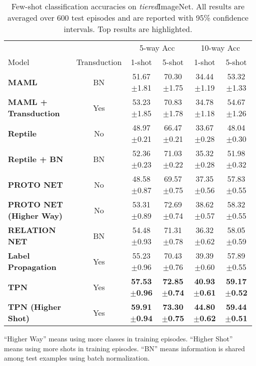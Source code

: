 \documentclass{article} \usepackage{iclr2019_conference,times}
\def\tiered{{\textit{tiered}ImageNet}}
\begin{document}
\begin{table}[t]
\centering
\begin{threeparttable}
\small
\caption{Few-shot classification accuracies on \tiered. All results are averaged over 600 test episodes and are reported with 95\% confidence intervals. Top results are highlighted.}
\label{tiered-results-std}
\begin{tabular}{lccccc}
\hline
                                       						&              & \multicolumn{2}{c}{5-way Acc} & \multicolumn{2}{c}{10-way Acc}                           \\
Model                                  						& Transduction & \multicolumn{1}{c}{1-shot} & \multicolumn{1}{c}{5-shot} & \multicolumn{1}{c}{1-shot} & \multicolumn{1}{c}{5-shot} \\ \hline
\textbf{MAML}                   & BN & 51.67$\pm$1.81 & 70.30$\pm$1.75 & 34.44$\pm$1.19 & 53.32$\pm$1.33  \\
\textbf{MAML + Transduction}    & Yes& 53.23$\pm$1.85 & 70.83$\pm$1.78 & 34.78$\pm$1.18 & 54.67$\pm$1.26  \\
\textbf{Reptile}                & No & 48.97$\pm$0.21 & 66.47$\pm$0.21 & 33.67$\pm$0.28 & 48.04$\pm$0.30  \\
\textbf{Reptile + BN}           & BN & 52.36$\pm$0.23 & 71.03$\pm$0.22 & 35.32$\pm$0.28 & 51.98$\pm$0.32  \\
\textbf{PROTO NET}              & No & 48.58$\pm$0.87 & 69.57$\pm$0.75 & 37.35$\pm$0.56 & 57.83$\pm$0.55  \\
\textbf{PROTO NET (Higher Way)} & No & 53.31$\pm$0.89 & 72.69$\pm$0.74 & 38.62$\pm$0.57 & 58.32$\pm$0.55  \\
\textbf{RELATION NET}           & BN & 54.48$\pm$0.93 & 71.31$\pm$0.78 & 36.32$\pm$0.62 & 58.05$\pm$0.59  \\ \hline
\textbf{Label Propagation}      & Yes& 55.23$\pm$0.96 & 70.43$\pm$0.76 & 39.39$\pm$0.60 & 57.89$\pm$0.55  \\
\textbf{TPN}     				& Yes& \textbf{57.53$\pm$0.96} & \textbf{72.85$\pm$0.74} & \textbf{40.93$\pm$0.61} & \textbf{59.17$\pm$0.52}   \\
\textbf{TPN (Higher Shot)}   	& Yes& \textbf{59.91$\pm$0.94} & \textbf{73.30$\pm$0.75} & \textbf{44.80$\pm$0.62} & \textbf{59.44$\pm$0.51}   \\ \hline
\end{tabular}
\begin{tablenotes}
  	\item * ``Higher Way'' means using more classes in training episodes. ``Higher Shot'' means using more shots in training episodes. ``BN'' means information is shared among test examples using batch normalization.
\end{tablenotes} 
\end{threeparttable}
\end{table}
\end{document}
